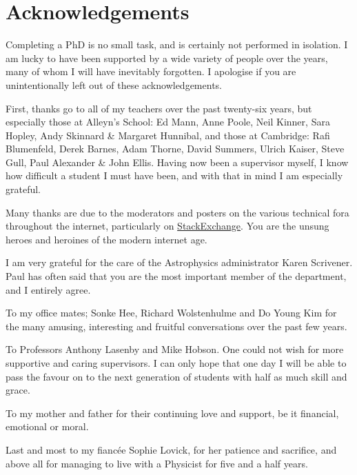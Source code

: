 \chapter{Acknowledgements}
Completing a PhD is no small task, and is certainly not performed in isolation. I am lucky to have been supported by a wide variety of people over the years, many of whom I will have inevitably forgotten. I apologise if you are unintentionally left out of these acknowledgements.

First, thanks go to all of my teachers over the past twenty-six years, but especially those at Alleyn's School: Ed Mann, Anne Poole, Neil Kinner, Sara Hopley, Andy Skinnard \& Margaret Hunnibal, and those at Cambridge: Rafi Blumenfeld, Derek Barnes, Adam Thorne, David Summers, Ulrich Kaiser, Steve Gull, Paul Alexander \& John Ellis. Having now been a supervisor myself, I know how difficult a student I must have been, and with that in mind I am especially grateful.

Many thanks are due to the moderators and posters on the various technical fora throughout the internet, particularly on \mbox{\href{http://stackexchange.com/}{StackExchange}}. You are the unsung heroes and heroines of the modern internet age.

I am very grateful for the care of the Astrophysics administrator Karen Scrivener. Paul has often said that you are the most important member of the department, and I entirely agree.

To my office mates; Sonke Hee, Richard Wolstenhulme and Do Young Kim for the many amusing, interesting and fruitful conversations over the past few years. 

To Professors Anthony Lasenby and Mike Hobson. One could not wish for more supportive and caring supervisors. I can only hope that one day I will be able to pass the favour on to the next generation of students with half as much skill and grace.

To my mother and father for their continuing love and support, be it financial, emotional or moral.

Last and most to my fianc\'{e}e Sophie Lovick, for her patience and sacrifice, and above all for managing to live with a Physicist for five and a half years.
